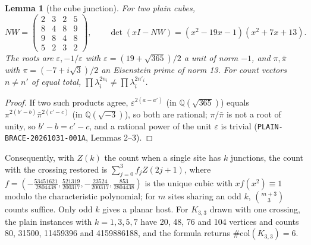 \documentclass[11pt]{article}
\newtheorem{lemma}[theorem]{Lemma}
\theoremstyle{definition}
\theoremstyle{remark}
\newcommand{\col}{\#\mathrm{col}}
\newcommand{\Q}{\mathbb{Q}}
\begin{document}
\begin{lemma}[the cube junction]\label{lem:cube}
For two plain cubes,
\[
NW=\begin{pmatrix}2&3&2&5\\8&4&8&9\\9&8&4&8\\5&2&3&2\end{pmatrix},\qquad
\det(xI-NW)=(x^2-19x-1)(x^2+7x+13).
\]
The roots are $\varepsilon,-1/\varepsilon$ with $\varepsilon=(19+\sqrt{365})/2$ a
unit of norm $-1$, and $\pi,\bar\pi$ with $\pi=(-7+i\sqrt3)/2$ an Eisenstein
prime of norm 13. For count vectors $n\ne n'$ of equal total,
$\prod\lambda_i^{2n_i}\ne\prod\lambda_i^{2n'_i}$.
\end{lemma}
\begin{proof}
If two such products agree, $\varepsilon^{2(a-a')}$ (in $\Q(\sqrt{365})$)
equals $\pi^{2(b'-b)}\bar\pi^{2(c'-c)}$ (in $\Q(\sqrt{-3})$), so both are
rational; $\pi/\bar\pi$ is not a root of unity, so $b'-b=c'-c$, and a rational
power of the unit $\varepsilon$ is trivial
(\texttt{PLAIN-BRACE-20261031-001A}, Lemmas 2--3).
\end{proof}

Consequently, with $Z(k)$ the count when a single site has $k$ junctions, the
count with the crossing restored is
$\sum_{j=0}^{3}f_jZ(2j+1)$, where
$f=(-\tfrac{53451621}{2804438},\tfrac{521319}{200317},-\tfrac{23524}{200317},\tfrac{853}{2804438})$
is the unique cubic with $xf(x^2)\equiv1$ modulo the characteristic
polynomial; for $m$ sites sharing an odd $k$, $\binom{m+3}{3}$ counts suffice.
Only odd $k$ gives a planar host. For $K_{3,3}$ drawn with one crossing, the
plain instances with $k=1,3,5,7$ have 20, 48, 76 and 104 vertices and counts
80, 31500, 11459396 and 4159886188, and the formula returns $\col(K_{3,3})=6$.
\end{document}
